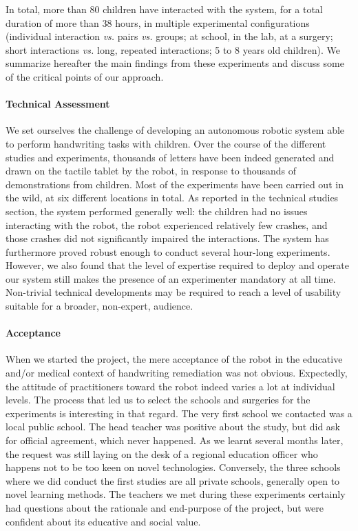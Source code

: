 \documentclass{article}
\newcommand{\vs}{\textit{vs.}\xspace}
\begin{document}
In total, more than 80 children have interacted with the system, for a total
duration of more than 38 hours, in multiple experimental configurations
(individual interaction \vs pairs \vs groups; at school, in the lab, at a
surgery; short interactions \vs long, repeated interactions; 5 to 8 years old
children). We summarize hereafter the main findings from these experiments and
discuss some of the critical points of our approach.

\paragraph{Technical Assessment} We set ourselves the challenge of developing an
autonomous robotic system able to perform handwriting tasks with children.
Over the course of the different studies and experiments, thousands of
letters have been indeed generated and drawn on the tactile tablet by the robot, in
response to thousands of demonstrations from children. Most of the experiments have been
carried out in the wild, at six different locations in total. As reported in the
technical studies section, the system performed generally well: the children had no
issues interacting with the robot, the robot experienced relatively few crashes,
and those crashes did not significantly impaired the interactions. The system
has furthermore proved robust enough to conduct several hour-long experiments.
However, we also found that the level of expertise required to deploy and
operate our system still makes the presence of an experimenter mandatory at all
time. Non-trivial technical developments may be required to reach a level of
usability suitable for a broader, non-expert, audience.

\paragraph{Acceptance} When we started the project, the mere acceptance of the
robot in the educative and/or medical context of handwriting remediation was not
obvious. Expectedly, the attitude of practitioners toward the robot indeed
varies a lot at individual levels. The process that led us to select the schools
and surgeries for the experiments is interesting in that regard. The very first
school we contacted was a local public school. The head teacher was positive
about the study, but did ask for official agreement, which never happened. As we
learnt several months later, the request was still laying on the desk of a
regional education officer who happens not to be too keen on novel technologies.
Conversely, the three schools where we did conduct the first studies are all
private schools, generally open to novel learning methods. The teachers we met
during these experiments certainly had questions about the rationale and
end-purpose of the project, but were confident about its educative and social
value.
\end{document}
